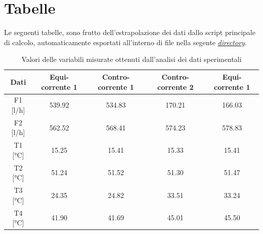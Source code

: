 \documentclass[a4paper,10pt]{article}                                                                                       %
\begin{document}
\section{Tabelle}                                                                                                           %
\label{sec:tables}                                                                                                          %
  Le seguenti tabelle, sono frutto dell'estrapolazione dei dati dallo script principale di calcolo, automaticamente
  esportati all'interno di file nella segente
  \textit{\href{https://github.com/CristianMerli/DataAnalysis/tree/master/final_doc/code_exports/output}{directory}}.
\begin{table}[H]                                                                                                            %
  \centering                                                                                                                %
  \begin{tabular}{||c|c|c|c|c||}                                                                                            %
    \hline
    Dati      & Equi-corrente 1 & Contro-corrente 1 & Contro-corrente 2 & Equi-corrente 1 \\
    \hline\hline
    F1 [l/h]  & 539.92          & 534.83            & 170.21            & 166.03          \\
    F2 [l/h]  & 562.52          & 568.41            & 574.23            & 578.83          \\
    T1 [°C]   & 15.25           & 15.41             & 15.33             & 15.41           \\
    T2 [°C]   & 51.24           & 51.52             & 51.30             & 51.47           \\
    T3 [°C]   & 24.35           & 24.82             & 33.51             & 33.24           \\
    T4 [°C]   & 41.90           & 41.69             & 45.01             & 45.50           \\
    \hline
  \end{tabular}                                                                                                             %
  \caption{Valori delle variabili misurate ottenuti dall'analisi dei dati sperimentali}                                     %
  \label{tab:measures_data}                                                                                                 %
\end{table}                                                                                                                 %
\end{document}

